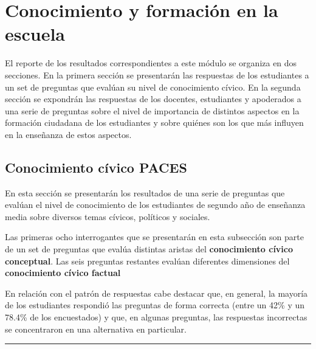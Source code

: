 \documentclass[
  14pt,
]{book}
\begin{document}
\hypertarget{conocimiento-y-formaciuxf3n-en-la-escuela}{%
\chapter{Conocimiento y formación en la escuela}\label{conocimiento-y-formaciuxf3n-en-la-escuela}}

El reporte de los resultados correspondientes a este módulo se organiza en dos secciones. En la primera sección se presentarán las respuestas de los estudiantes a un set de preguntas que evalúan su nivel de conocimiento cívico. En la segunda sección se expondrán las respuestas de los docentes, estudiantes y apoderados a una serie de preguntas sobre el nivel de importancia de distintos aspectos en la formación ciudadana de los estudiantes y sobre quiénes son los que más influyen en la enseñanza de estos aspectos.

\hypertarget{conocimiento-cuxedvico-paces}{%
\section{Conocimiento cívico PACES}\label{conocimiento-cuxedvico-paces}}

En esta sección se presentarán los resultados de una serie de preguntas que evalúan el nivel de conocimiento de los estudiantes de segundo año de enseñanza media sobre diversos temas cívicos, políticos y sociales.

Las primeras ocho interrogantes que se presentarán en esta subsección son parte de un set de preguntas que evalúa distintas aristas del \textbf{conocimiento cívico conceptual}. Las seis preguntas restantes evalúan diferentes dimensiones del \textbf{conocimiento cívico factual}

En relación con el patrón de respuestas cabe destacar que, en general, la mayoría de los estudiantes respondió las preguntas de forma correcta (entre un 42\% y un 78.4\% de los encuestados) y que, en algunas preguntas, las respuestas incorrectas se concentraron en una alternativa en particular.

\begin{center}\rule{0.5\linewidth}{0.5pt}\end{center}
\end{document}
